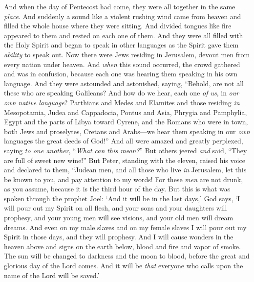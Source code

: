 \begin{biblechapter} %
 And when the day of Pentecost had come, they were all together in the same \textit{place}.
\verse And suddenly a sound like a violent rushing wind came from heaven and filled the whole house where they were sitting.
\verse And divided tongues like fire appeared to them and rested on each one of them.
\verse And they were all filled with the Holy Spirit and began to speak in other languages as the Spirit gave them \textit{ability} to speak out.
\verse Now there were Jews residing in Jerusalem, devout men from every nation under heaven.
\verse And \textit{when} this sound occurred, the crowd gathered and was in confusion, because each one was hearing them speaking in his own language.
\verse And they were astounded and astonished, saying, “Behold, are not all these who are speaking Galileans?
\verse And how do we hear, each one \textit{of us}, in \textit{our own native language}?
\verse Parthians and Medes and Elamites and those residing \textit{in} Mesopotamia, Judea and Cappadocia, Pontus and Asia,
\verse Phrygia and Pamphylia, Egypt and the parts of Libya toward Cyrene, and the Romans who were in town,
\verse both Jews and proselytes, Cretans and Arabs—we hear them speaking in our \textit{own} languages the great deeds of God!”
\verse And all were amazed and greatly perplexed, saying \textit{to one another}, “\textit{What can this mean?}”
\verse But others jeered \textit{and} said, “They are full of sweet new wine!”
 But Peter, standing with the eleven, raised his voice and declared to them, “Judean men, and all those who live \textit{in} Jerusalem, let this be known to you, and pay attention to my words!
\verse For these \textit{men} are not drunk, as you assume, because it is the third hour of the day.
\verse But this is what was spoken through the prophet Joel:
\verse ‘And it will be in the last days,’ God says, 
‘I will pour out my Spirit on all flesh, 
and your sons and your daughters will prophesy, 
and your young men will see visions, 
and your old men will dream dreams.
\verse And even on my male slaves and on my female slaves 
I will pour out my Spirit in those days, and they will prophesy.
\verse And I will cause wonders in the heaven above 
and signs on the earth below, 
blood and fire and vapor of smoke.
\verse The sun will be changed to darkness 
and the moon to blood, 
before the great and glorious day of the Lord comes.
\verse And it will be \textit{that} everyone who calls upon the name of the Lord will be saved.’

\end{biblechapter}
